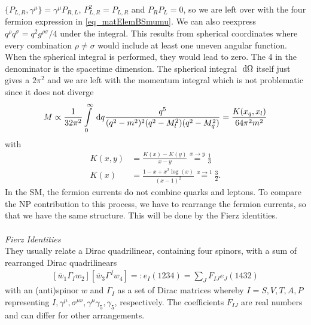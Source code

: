 $\{P_{L,R},\gamma^\mu\} = \gamma^\mu P_{R,L}$, $P_{L,R}^2 = P_{L,R}$ and $P_R P_L = 0$, so we are left over with the four fermion expression in 
\eqref{eq_matElemBSmumu}. We can also reexpress $q^\rho q^\sigma = q^2 g^{\rho\sigma}/4$ under the integral. This results from spherical coordinates where
every combination $\rho\neq\sigma$ would include at least one uneven angular function. When the spherical integral is performed, they would lead to zero. The 
4 in the denominator is the spacetime dimension. The spherical integral $\; \mathrm{d} \Omega$ itself just gives a $2\pi^2$ and we are left with the momentum integral
which is not problematic since it does not diverge
\begin{align}
 M \propto \frac{1}{32\pi^2} \int\limits_0^\infty \; \mathrm{d} q \frac{q^5}{(q^2-m^2)^2(q^2-M_l^2)(q^2-M_q^2)} = \frac{K(x_q,x_l)}{64\pi^2 m^2}
\end{align}
with
\begin{align}
 K(x,y) &= \frac{K(x)-K(y)}{x-y} \stackrel{x\rightarrow y}{=} \frac13\\
 K(x)&=\frac{1-x+x^2\log(x)}{(x-1)^2} \stackrel{x\rightarrow 1}{=} \frac32.
\end{align}
In the SM, the fermion currents do not combine quarks and leptons. To compare the NP contribution to this process, we have to rearrange the fermion currents,
so that we have the same structure. This will be done by the Fierz identities.
\\ \\ \noindent \textit{Fierz Identities}\\
They usually relate a Dirac quadrilinear, containing four spinors, with a sum of rearranged Dirac quadrilinears \cite{Fierz}
\begin{align}
  \left[\bar w_1\Gamma_I^{} w_2\right] \left[\bar w_3 \Gamma^I w_4 \right] =: e_I(1234) = \sum\limits_J F_{IJ} e_J(1432)
\end{align}
with an (anti)spinor $w$ and $\Gamma_I$ as a set of Dirac matrices whereby $I=S,V,T,A,P$ representing $I,\gamma^\mu,\sigma^{\mu\nu},\gamma^\mu\gamma_5,\gamma_5$, 
respectively. The coefficients $F_{IJ}$ are real numbers and can differ for other arrangements.
